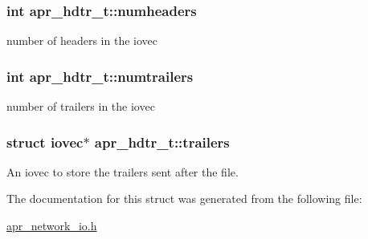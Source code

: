 \subsubsection[{\texorpdfstring{numheaders}{numheaders}}]{\setlength{\rightskip}{0pt plus 5cm}int apr\+\_\+hdtr\+\_\+t\+::numheaders}\hypertarget{structapr__hdtr__t_a8915ade68ef06f4d23005ec0f81e9305}{}\label{structapr__hdtr__t_a8915ade68ef06f4d23005ec0f81e9305}
number of headers in the iovec 
\subsubsection[{\texorpdfstring{numtrailers}{numtrailers}}]{\setlength{\rightskip}{0pt plus 5cm}int apr\+\_\+hdtr\+\_\+t\+::numtrailers}\hypertarget{structapr__hdtr__t_a9468659de891a5672b0b84cf442e9c7b}{}\label{structapr__hdtr__t_a9468659de891a5672b0b84cf442e9c7b}
number of trailers in the iovec 
\subsubsection[{\texorpdfstring{trailers}{trailers}}]{\setlength{\rightskip}{0pt plus 5cm}struct iovec$\ast$ apr\+\_\+hdtr\+\_\+t\+::trailers}\hypertarget{structapr__hdtr__t_a538387cfa0065abc2bfa6ba7393fa3ee}{}\label{structapr__hdtr__t_a538387cfa0065abc2bfa6ba7393fa3ee}
An iovec to store the trailers sent after the file. 

The documentation for this struct was generated from the following file\+:\begin{DoxyCompactItemize}
\item 
\hyperlink{apr__network__io_8h}{apr\+\_\+network\+\_\+io.\+h}\end{DoxyCompactItemize}
